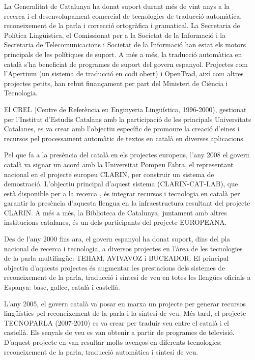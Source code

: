 \documentclass[]{../../metanetpaper}
\begin{document}
\begin{multicols}{2}
La Generalitat de Catalunya ha donat suport durant més de vint anys a la recerca i el desenvolupament comercial de tecnologies de traducció automàtica, reconeixement de la parla i correcció ortogràfica i gramatical. La Secretaria de Política Lingüística, el Comissionat per a la Societat de la Informació i la Secretaria de Telecomunicacions i Societat de la Informació han estat els motors principals de les polítiques de suport. A més a més, la traducció automàtica en català s’ha beneficiat de programes de suport del govern espanyol. Projectes com l’Apertium (un sistema de traducció en codi obert) i OpenTrad, així com altres projectes petits, han rebut finançament per part del Ministeri de Ciència i Tecnologia. 

El CREL (Centre de Referència en Enginyeria Lingüística, 1996-2000), gestionat per l’Institut d’Estudis Catalans amb la participació de les principals Universitats Catalanes, es va crear amb l’objectiu específic de promoure la creació d’eines i recursos pel processament automàtic de textos en català en diverses aplicacions. 

Pel que fa a la presència del català en els projectes europeus, l’any 2008 el govern català va signar un acord amb la Universitat Pompeu Fabra, el representant nacional en el projecte europeu CLARIN, per construir un sistema de demostració. L’objectiu principal d’aquest sistema (CLARIN-CAT-LAB), que està disponible per a la recerca \cite{CAT-Nota30}, és integrar recursos i tecnologia en català per garantir la presència d’aquesta llengua en la infraestructura resultant del projecte CLARIN. A més a més, la Biblioteca de Catalunya, juntament amb altres institucions catalanes, és un dels participants del projecte EUROPEANA. 

Des de l’any 2000 fins ara, el govern espanyol ha donat suport, dins del pla nacional de recerca i tecnologia, a diversos projectes en l’àrea de les tecnologies de la parla multilingüe: TEHAM, AVIVAVOZ i BUCEADOR. El principal objectiu d’aquests projectes és augmentar les prestacions dels sistemes de reconeixement de la parla, traducció i síntesi de veu en totes les llengües oficials a Espanya: basc, gallec, català i castellà. 

L’any 2005, el govern català va posar en marxa un projecte per generar recursos lingüístics pel reconeixement de la parla i la síntesi de veu. Més tard, el projecte TECNOPARLA (2007-2010) es va crear per traduir veu entre el català i el castellà. Els senyals de veu es van obtenir a partir de programes de televisió. D’aquest projecte en van resultar molts avenços en diferents tecnologies: reconeixement de la parla, traducció automàtica i síntesi de veu.


\end{multicols}
\end{document}
